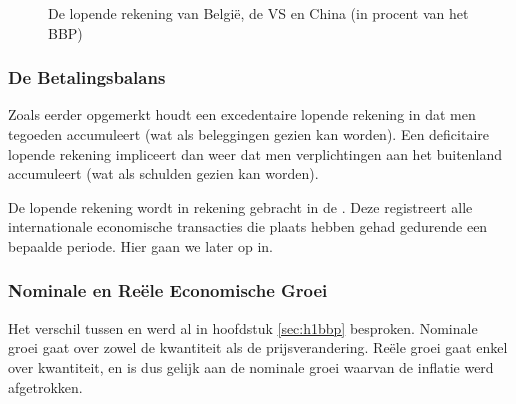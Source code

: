 \begin{figure}[H]
\small\centering\captionsetup{justification=centering,margin=2cm}
\caption{De lopende rekening van Belgi\"e, de VS en China (in procent van het BBP)}
\label{fig:h5werlr}
\end{figure}

\subsubsection{De Betalingsbalans}

Zoals eerder opgemerkt houdt een excedentaire lopende rekening in dat men tegoeden accumuleert (wat als beleggingen gezien kan worden). Een deficitaire lopende rekening impliceert dan weer dat men verplichtingen aan het buitenland accumuleert (wat als schulden gezien kan worden).\\

\par De lopende rekening wordt in rekening gebracht in de . Deze registreert alle internationale economische transacties die plaats hebben gehad gedurende een bepaalde periode. Hier gaan we later op in. 

\subsubsection{Nominale en Re\"ele Economische Groei}

Het verschil tussen  en  werd al in hoofdstuk \ref{sec:h1bbp} besproken. Nominale groei gaat over zowel de kwantiteit als de prijsverandering. Re\"ele groei gaat enkel over kwantiteit, en is dus gelijk aan de nominale groei waarvan de inflatie werd afgetrokken. \\

